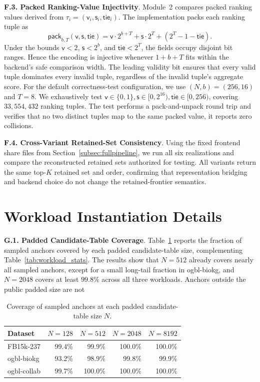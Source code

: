 \documentclass[conference,compsoc,letterpaper]{IEEEtran}
\theoremstyle{definition}
\theoremstyle{remark}
\newcommand{\myparagraph}[1]{\noindent \textbf{#1}.}
\newcommand{\scorebits}{b}
\newcommand{\valid}{\mathsf{v}}
\newcommand{\score}{\mathsf{s}}
\newcommand{\tie}{\mathsf{tie}}
\begin{document}
\myparagraph{F.3. Packed Ranking-Value Injectivity}
\label{app:correctness:injectivity}
Module~2 compares packed ranking values derived from $\tau_i=(\valid_i,\score_i,\tie_i)$.
The implementation packs each ranking tuple as
\[
\mathsf{pack}_{\scorebits,T}(\valid,\score,\tie)
=
\valid\cdot 2^{\scorebits+T}
+
\score\cdot 2^T
+
(2^T-1-\tie).
\]
Under the bounds $\valid<2$, $\score<2^{\scorebits}$, and $\tie<2^T$, the fields occupy disjoint bit ranges.
Hence the encoding is injective whenever $1+\scorebits+T$ fits within the backend's safe comparison width.
The leading validity bit ensures that every valid tuple dominates every invalid tuple, regardless of the invalid tuple's aggregate score.
For the default correctness-test configuration, we use $(N,\scorebits)=(256,16)$ and $T=8$. We exhaustively test $\valid\in\{0,1\}, \score\in[0,2^{16}),\tie\in[0,256)$, covering $33{,}554{,}432$ ranking tuples.
The test performs a pack-and-unpack round trip and verifies that no two distinct tuples map to the same packed value, it reports zero collisions.

\myparagraph{F.4. Cross-Variant Retained-Set Consistency}
\label{app:correctness:crossvariant}
Using the fixed frontend share files from Section~\ref{subsec:fullpipeline},
we run all six realizations and compare the reconstructed retained sets
authorized for testing. All variants return the same top-\(K\) retained
set and order, confirming that representation bridging and backend
choice do not change the retained-frontier semantics.

\section{Workload Instantiation Details}
\label{app:workload}
\vspace{-2mm}

\myparagraph{G.1. Padded Candidate-Table Coverage}
\label{app:workload_coverage}
Table~\ref{tab:app_n_coverage} reports the fraction of sampled anchors covered by each padded candidate-table size, complementing Table~\ref{tab:workload_stats}.
The results show that \(N=512\) already covers nearly all sampled anchors, except for a small long-tail fraction in ogbl-biokg, and \(N=2048\) covers at least \(99.8\%\) across all three workloads.
Anchors outside the public padded size are not

\begin{table}[!ht]
\centering
\small
\caption{Coverage of sampled anchors at each padded candidate-table size $N$.}
\label{tab:app_n_coverage}
\begin{tabular}{@{}lrrrr@{}}
\toprule
\textbf{Dataset} & $N=128$ & $N=512$ & $N=2048$ & $N=8192$ \\
\midrule
FB15k-237   & 99.4\% & 99.9\% & 100.0\% & 100.0\% \\
ogbl-biokg  & 93.2\% & 98.9\% & 99.8\%  & 99.9\%  \\
ogbl-collab & 99.7\% & 100.0\% & 100.0\% & 100.0\% \\
\bottomrule
\end{tabular}
\end{table}
\end{document}
